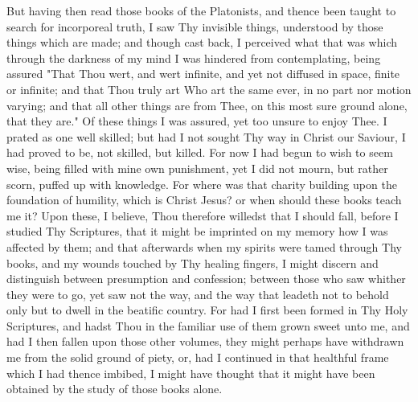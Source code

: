 \documentclass[b5paper,openright,12pt,twoside]{book}
\begin{document}
But having then read those books of the Platonists, and thence been
taught to search for incorporeal truth, I saw Thy invisible things,
understood by those things which are made; and though cast back, I
perceived what that was which through the darkness of my mind I was
hindered from contemplating, being assured "That Thou wert, and wert
infinite, and yet not diffused in space, finite or infinite; and that
Thou truly art Who art the same ever, in no part nor motion varying;
and that all other things are from Thee, on this most sure ground alone,
that they are." Of these things I was assured, yet too unsure to enjoy
Thee. I prated as one well skilled; but had I not sought Thy way in
Christ our Saviour, I had proved to be, not skilled, but killed. For now
I had begun to wish to seem wise, being filled with mine own punishment,
yet I did not mourn, but rather scorn, puffed up with knowledge. For
where was that charity building upon the foundation of humility, which
is Christ Jesus? or when should these books teach me it? Upon these, I
believe, Thou therefore willedst that I should fall, before I studied
Thy Scriptures, that it might be imprinted on my memory how I was
affected by them; and that afterwards when my spirits were tamed through
Thy books, and my wounds touched by Thy healing fingers, I might discern
and distinguish between presumption and confession; between those who
saw whither they were to go, yet saw not the way, and the way that
leadeth not to behold only but to dwell in the beatific country. For
had I first been formed in Thy Holy Scriptures, and hadst Thou in the
familiar use of them grown sweet unto me, and had I then fallen upon
those other volumes, they might perhaps have withdrawn me from the solid
ground of piety, or, had I continued in that healthful frame which I had
thence imbibed, I might have thought that it might have been obtained by
the study of those books alone.
\end{document}

